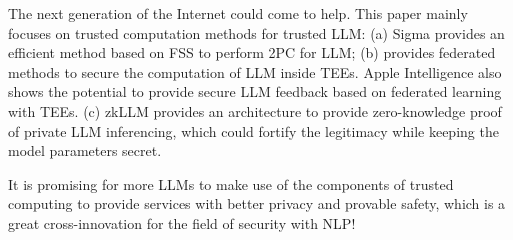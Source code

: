 \documentclass[lang=en]{sjtuarticle}
\begin{document}
The next generation of the Internet could come to help. This paper mainly focuses on trusted computation methods for trusted LLM: (a) Sigma \cite{cryptoeprint:2023/1269} provides an efficient method based on FSS to perform 2PC for LLM; (b) \cite{huang2024fast} provides federated methods to secure the computation of LLM inside TEEs. Apple Intelligence \cite{apple} also shows the potential to provide secure LLM feedback based on federated learning with TEEs. (c) zkLLM \cite{sun2024zkllm} provides an architecture to provide zero-knowledge proof of private LLM inferencing, which could fortify the legitimacy while keeping the model parameters secret.

It is promising for more LLMs to make use of the components of trusted computing to provide services with better privacy and provable safety, which is a great cross-innovation for the field of security with NLP!

\printbibliography
\end{document}
